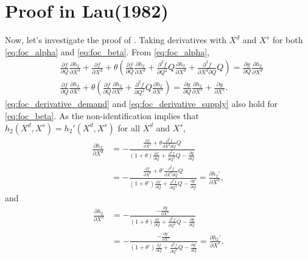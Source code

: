 \documentclass[11pt, a4paper]{article}
\theoremstyle{remark}
\begin{document}
\section{Proof in Lau(1982)}
Now, let's investigate the proof of \citet{lau1982identifying}.
Taking derivatives with $X^{d}$ and $X^{s}$ for both \eqref{eq:foc_alpha}
and \eqref{eq:foc_beta}.
From \eqref{eq:foc_alpha},
\begin{align}
    & \frac{\partial f}{\partial Q}\frac{\partial h_2}{\partial X^{d}} + \frac{\partial f}{\partial X^{d}} + \theta\left(\frac{\partial f}{\partial Q}\frac{\partial h_2}{\partial X^{d}}  + \frac{\partial^2 f}{\partial Q^2}Q\frac{\partial h_2}{\partial X^{d}} + \frac{\partial^2 f}{\partial X^{d}\partial Q}Q \right) = \frac{\partial g}{\partial Q}\frac{\partial h_2}{\partial X^{d}}\label{eq:foc_derivative_demand}\\
    & \frac{\partial f}{\partial Q}\frac{\partial h_2}{\partial X^{s}} + \theta \left(\frac{\partial f}{\partial Q}\frac{\partial h_2}{\partial X^{s}}  + \frac{\partial^2 f}{\partial Q^2}Q\frac{\partial h_2}{\partial X^{s}} \right) =  \frac{\partial g}{\partial Q}\frac{\partial h_2}{\partial X^{s}} + \frac{\partial g}{\partial X^{s}}\label{eq:foc_derivative_supply}.
\end{align}
\eqref{eq:foc_derivative_demand} and \eqref{eq:foc_derivative_supply} also hold for \eqref{eq:foc_beta}.
As the non-identification implies that $h_2(X^{d}, X^{s}) = h_2'(X^{d}, X^{s})$ for all $X^{d}$ and $X^{s}$,
\begin{align}
    \frac{\partial h_2}{\partial X^{d}} & = - \frac{\frac{\partial f}{\partial X^{d}} + \theta \frac{\partial^2 f}{\partial X^{d}\partial Q}Q }{(1+\theta)\frac{\partial f}{\partial Q} + \frac{\partial^2 f}{\partial Q^2}Q - \frac{\partial g}{\partial Q}}\\
    & = - \frac{\frac{\partial f}{\partial X^{d}} + \theta' \frac{\partial^2 f}{\partial X^{d}\partial Q}Q }{(1+\theta')\frac{\partial f}{\partial Q} + \frac{\partial^2 f}{\partial Q^2}Q - \frac{\partial g'}{\partial Q}}= \frac{\partial h_2'}{\partial X^{d}},
\end{align}
and
\begin{align}
    \frac{\partial h_2}{\partial X^{s}} & = -\frac{-\frac{\partial g}{\partial X^{s}}}{(1+\theta)\frac{\partial f}{\partial Q} + \frac{\partial^2 f}{\partial Q^2}Q - \frac{\partial g}{\partial Q}} \\
     & = -\frac{-\frac{\partial g'}{\partial X^{s}}}{(1+\theta')\frac{\partial f}{\partial Q} + \frac{\partial^2 f}{\partial Q^2}Q - \frac{\partial g'}{\partial Q}} = \frac{\partial h_2'}{\partial X^{s}}.
\end{align}
\end{document}
